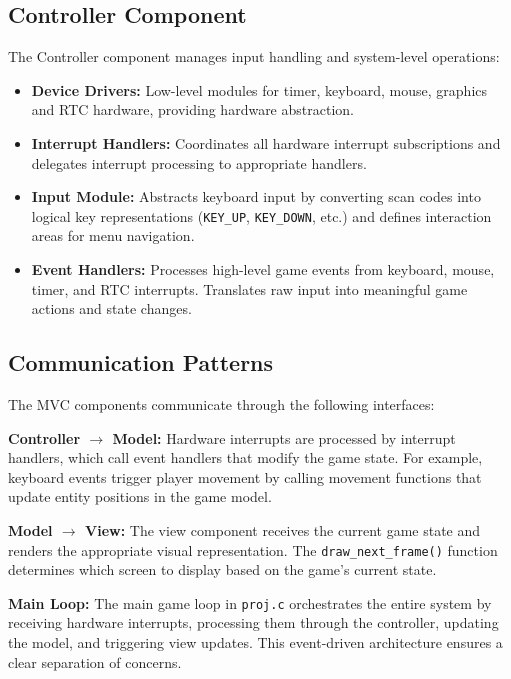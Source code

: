 \documentclass[12pt,a4paper]{article}
\begin{document}
\subsection{Controller Component}

The Controller component manages input handling and system-level operations:

\begin{itemize}
  \item \textbf{Device Drivers:} Low-level modules for timer, keyboard, mouse, graphics and RTC hardware, providing hardware abstraction.
  \item \textbf{Interrupt Handlers:} Coordinates all hardware interrupt subscriptions and delegates interrupt processing to appropriate handlers.
  \item \textbf{Input Module:} Abstracts keyboard input by converting scan codes into logical key representations (\texttt{KEY\_UP}, \texttt{KEY\_DOWN}, etc.) and defines interaction areas for menu navigation.
  \item \textbf{Event Handlers:} Processes high-level game events from keyboard, mouse, timer, and RTC interrupts. Translates raw input into meaningful game actions and state changes.
\end{itemize}

\subsection{Communication Patterns}

The MVC components communicate through the following interfaces:

\textbf{Controller $\rightarrow$ Model:} Hardware interrupts are processed by interrupt handlers, which call event handlers that modify the game state. For example, keyboard events trigger player movement by calling movement functions that update entity positions in the game model.

\textbf{Model $\rightarrow$ View:} The view component receives the current game state and renders the appropriate visual representation. The \texttt{draw\_next\_frame()} function determines which screen to display based on the game's current state.

\textbf{Main Loop:} The main game loop in \texttt{proj.c} orchestrates the entire system by receiving hardware interrupts, processing them through the controller, updating the model, and triggering view updates. This event-driven architecture ensures a clear separation of concerns.
\end{document}
